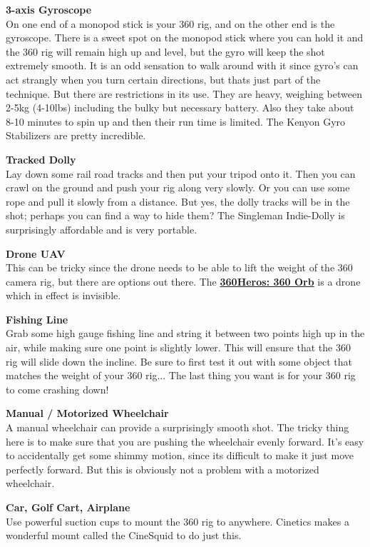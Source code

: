 \begin{fullwidth}
{\bf 3-axis Gyroscope}
\\
On one end of a monopod stick is your 360 rig, and on the other end is the gyroscope. There is a sweet spot on the monopod stick where you can hold it and the 360 rig will remain high up and level, but the gyro will keep the shot extremely smooth. It is an odd sensation to walk around with it since gyro's can act strangly when you turn certain directions, but thats just part of the technique. But there are restrictions in its use. They are heavy, weighing between 2-5kg (4-10lbs) including the bulky but necessary battery. Also they take about 8-10 minutes to spin up and then their run time is limited. The Kenyon Gyro Stabilizers are pretty incredible.

{\bf Tracked Dolly}
\\
Lay down some rail road tracks and then put your tripod onto it. Then you can crawl on the ground and push your rig along very slowly. Or you can use some rope and pull it slowly from a distance. But yes, the dolly tracks will be in the shot; perhaps you can find a way to hide them? The Singleman Indie-Dolly is surprisingly affordable and is very portable. 

{\bf Drone UAV}
\\
This can be tricky since the drone needs to be able to lift the weight of the 360 camera rig, but there are options out there. The \textbf{\href{http://youtu.be/-5iUZybKXr0}{360Heros: 360 Orb}} is a drone which in effect is invisible.

{\bf Fishing Line}
\\
Grab some high gauge fishing line and string it between two points high up in the air, while making sure one point is slightly lower. This will ensure that the 360 rig will slide down the incline. Be sure to first test it out with some object that matches the weight of your 360 rig... The last thing you want is for your 360 rig to come crashing down!

{\bf Manual / Motorized Wheelchair}
\\
A manual wheelchair can provide a surprisingly smooth shot. The tricky thing here is to make sure that you are pushing the wheelchair evenly forward. It's easy to accidentally get some shimmy motion, since its difficult to make it just move perfectly forward. But this is obviously not a problem with a motorized wheelchair. 

{\bf Car, Golf Cart, Airplane}
\\
Use powerful suction cups to mount the 360 rig to anywhere. Cinetics makes a wonderful mount called the CineSquid to do just this.





\clearpage
\end{fullwidth}
